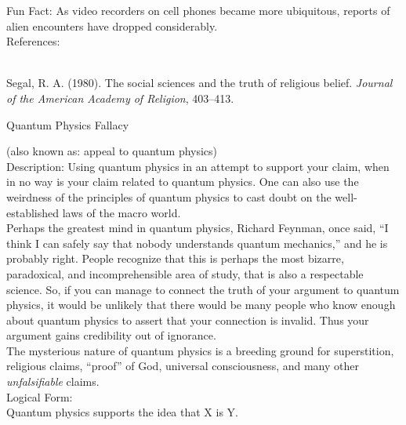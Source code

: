 \documentclass[a4paper,12pt,single,pdftex]{scrbook}
\begin{document}
    
      Fun Fact: As video recorders on cell phones became more ubiquitous, reports of alien encounters have dropped considerably.
    \\

    References:

    
      
        
      \\

      
        
          Segal, R. A. (1980). The social sciences and the truth of religious belief. {\it Journal of the American Academy of Religion}, 403–413.
        
      
    
  

Quantum Physics Fallacy
    
      (also known as: appeal to quantum physics)
    \\

  
    
      
        Description: Using quantum physics in an attempt to support your claim, when in no way is your claim related to quantum physics.  One can also use the weirdness of the principles of quantum physics to cast doubt on the well-established laws of the macro world.
      \\

      
        Perhaps the greatest mind in quantum physics, Richard Feynman, once said, “I think I can safely say that nobody understands quantum mechanics,” and he is probably right.  People recognize that this is perhaps the most bizarre, paradoxical, and incomprehensible area of study, that is also a respectable science.  So, if you can manage to connect the truth of your argument to quantum physics, it would be unlikely that there would be many people who know enough about quantum physics to assert that your connection is invalid. Thus your argument gains credibility out of ignorance.
      \\

      
        The mysterious nature of quantum physics is a breeding ground for superstition, religious claims, “proof” of God, universal consciousness, and many other {\it unfalsifiable} claims. 
      \\

      
        Logical Form:
      \\

      
        Quantum physics supports the idea that X is Y.
      \\
\end{document}
